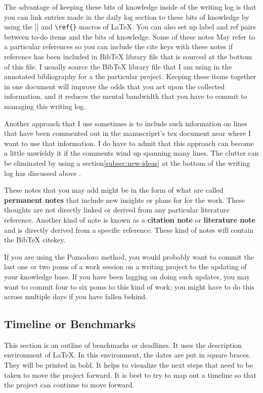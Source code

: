\documentclass[10pt,letterpaper]{article}
\begin{document}
The advantage of keeping these bits of knowledge inside of the writing log is that you can link entries made in the daily log section to these bits of knowledge by using the \verb||\label{}|| and \verb|\ref{}| macros of LaTeX.
You can also set up label and ref pairs between to-do items and the bits of knowledge.
Some of these notes May refer to a particular references so you can include the cite keys with these notes if reference has been included in BibTeX library file that is sourced at the bottom of this file.
I usually source the BibTeX library file that I am using in the annotated bibliography for a the particular project.
Keeping these items together in one document will improve the odds that you act upon the collected information, and it reduces the mental bandwidth that you have to commit to managing this writing log.

Another approach that I use sometimes is to include such information on lines that have been commented out in the manuscriprt's tex document near where I want to use that information.
I do have to admit that this approach can become a little unwieldy it if the comments wind up spanning many lines.
The clutter can be eliminated by using a section\ref{subsec:new-ideas} at the bottom of the writing log has discussed above .

These notes that you may add might be in the form of what are called \textbf{permanent notes} that include new insights or plans for for the work.
These thoughts are not directly linked or derived from any particular literature reference.
Another kind of note is known as a \textbf{citation note} or \textbf{literature note} and is directly derived from a specific reference.
These kind of notes will contain the BibTeX citekey.

If you are using the Pomodoro method, you would probably want to commit the last one or two poms of a work session on a writing project to the updating of your knowledge base.
If you have been lagging on doing such updates, you may want to commit four to six poms to this kind of work; you might have to do this across multiple days if you have fallen behind.





\subsection{Timeline or Benchmarks}
\label{sub:benchmarks}

This section is an outline of benchmarks or deadlines.
It uses the description environment of LaTeX.
In this environment, the dates are put in square braces.
They will be printed in bold.
It helps to visualize the next steps that need to be taken to move the project forward.
It is best to try to map out a timeline so that the project can continue to move forward.
\end{document}
